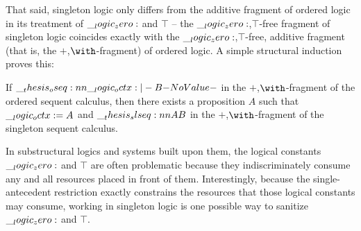 That said, singleton logic only differs from the additive fragment of ordered logic in its treatment of $\__logic_zero:$ and $\top$ -- the $\__logic_zero:$,$\top$-free fragment of singleton logic coincides exactly with the $\__logic_zero:$,$\top$-free, additive fragment (that is, the $\plus$,$\with$-fragment) of ordered logic.
% 
% 
A simple structural induction proves this:
\begin{theorem}\label{thm:singleton-logic:additive-fragment}
  If\/ $\oseq{\octx |- B}$ in the $\plus$,$\with$-fragment of the ordered sequent calculus, then there exists a proposition $A$ such that $\__logic_octx: = A$ and $\slseq{A |- B}$ in the $\plus$,$\with$-frag\-ment of the singleton sequent calculus.
\end{theorem}

In substructural logics and systems built upon them, the logical constants $\__logic_zero:$ and $\top$ are often problematic because they indiscriminately consume any and all resources placed in front of them.\autocites{Cervesato+:TCS00}{Schack-Nielsen+Schuermann:IJCAR08}
Interestingly, because the single-antecedent restriction exactly constrains the resources that those logical constants may consume, working in singleton logic is one possible way to sanitize $\__logic_zero:$ and $\top$.



